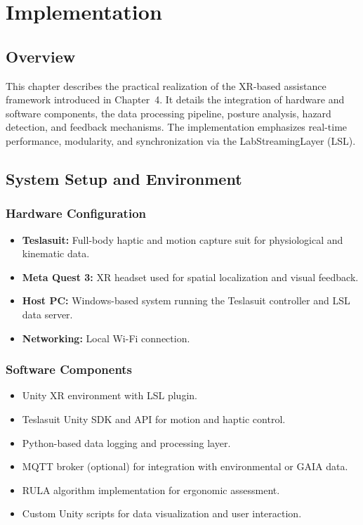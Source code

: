 \chapter{Implementation}

\section{Overview}
This chapter describes the practical realization of the XR-based assistance framework introduced in Chapter~4. It details the integration of hardware and software components, the data processing pipeline, posture analysis, hazard detection, and feedback mechanisms. The implementation emphasizes real-time performance, modularity, and synchronization via the LabStreamingLayer (LSL).

\section{System Setup and Environment}
\subsection{Hardware Configuration}
\begin{itemize}
    \item \textbf{Teslasuit:} Full-body haptic and motion capture suit for physiological and kinematic data.
    \item \textbf{Meta Quest 3:} XR headset used for spatial localization and visual feedback.
    \item \textbf{Host PC:} Windows-based system running the Teslasuit controller and LSL data server.
    \item \textbf{Networking:} Local Wi-Fi connection.
\end{itemize}

\subsection{Software Components}
\begin{itemize}
    \item Unity XR environment with LSL plugin.
    \item Teslasuit Unity SDK and API for motion and haptic control.
    \item Python-based data logging and processing layer.
    \item MQTT broker (optional) for integration with environmental or GAIA data.
    \item RULA algorithm implementation for ergonomic assessment.
    \item Custom Unity scripts for data visualization and user interaction.
\end{itemize}

